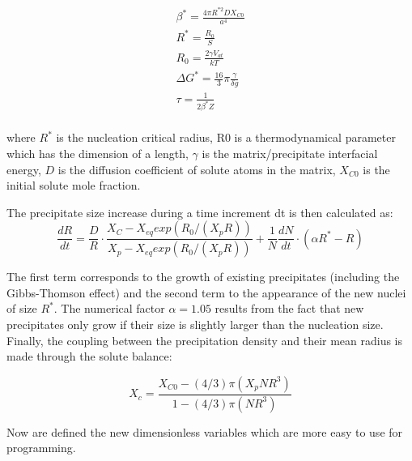 \documentclass[12pt,a4paper]{article}
\begin{document}
\begin{subequations}
	\begin{align}
\beta^* = \frac{4\pi R^{*2} D X_{C0}}{a^4} \\
R^* = \frac{R_0}{S} \\
R_0 = \frac{2\gamma V_{at}}{kT} \\
\Delta G^* = \frac{16}{3}\pi \frac{\gamma}{\delta g} \\
\tau = \frac{1}{2\beta^* Z} \\
	\end{align}
	
\end{subequations}

where $R^*$ is the nucleation critical radius, R0 is a thermodynamical parameter
which has the dimension of a length, $\gamma$ is the matrix/precipitate interfacial energy, $D$ is the diffusion coefficient of solute atoms in the matrix, $X_{C0}$ is the initial solute mole fraction.

The precipitate size increase during a time increment dt is then calculated as:
\begin{equation}
\frac{dR}{dt} = \frac{D}{R} \cdot \frac{X_C - X_{eq} exp(R_0/(X_pR))}{X_p - X_{eq} exp(R_0/(X_pR))} + \frac{1}{N}\frac{dN}{dt} \cdot (\alpha R^* - R)
\end{equation}

The first term corresponds to the growth of existing precipitates (including the Gibbs-Thomson effect) and the second term to the appearance of the new nuclei of
size $R^*$. The numerical factor $\alpha = 1.05$ results from the fact that new precipitates only grow if their size is slightly larger than the nucleation size. 
Finally, the coupling between the precipitation density and their mean radius is made through the solute balance:

\begin{equation}
X_c = \frac{X_{C0}-(4/3)\pi (X_pNR^3)}{1-(4/3)\pi (NR^3)}
\end{equation}

Now are defined the new dimensionless variables which are more easy to use for programming.




\end{document}
